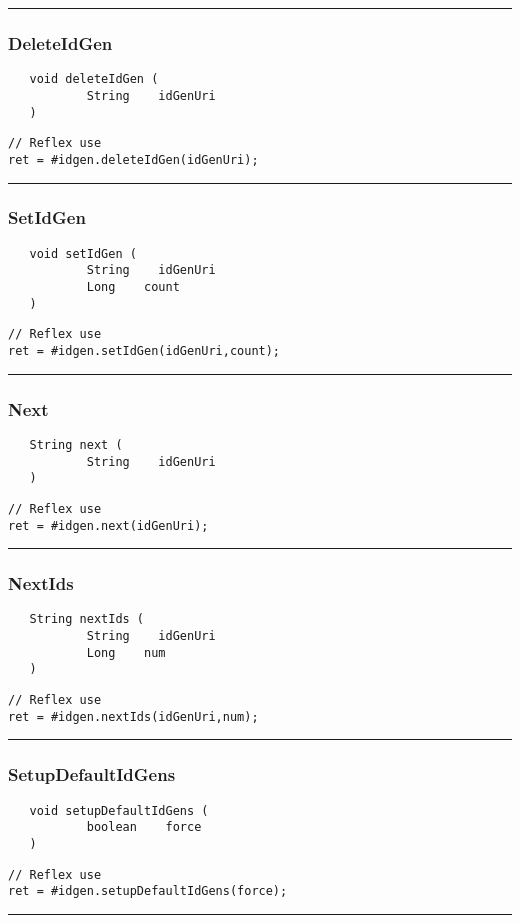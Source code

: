 \rule{15cm}{2pt}
\subsubsection{DeleteIdGen}
\label{Api:DeleteIdGen}
\begin{verbatim}
   void deleteIdGen (
           String    idGenUri
   )
\end{verbatim}
\begin{lstlisting}[language=reflex]
// Reflex use
ret = #idgen.deleteIdGen(idGenUri);
\end{lstlisting}



\rule{15cm}{2pt}
\subsubsection{SetIdGen}
\label{Api:SetIdGen}
\begin{verbatim}
   void setIdGen (
           String    idGenUri
           Long    count
   )
\end{verbatim}
\begin{lstlisting}[language=reflex]
// Reflex use
ret = #idgen.setIdGen(idGenUri,count);
\end{lstlisting}



\rule{15cm}{2pt}
\subsubsection{Next}
\label{Api:Next}
\begin{verbatim}
   String next (
           String    idGenUri
   )
\end{verbatim}
\begin{lstlisting}[language=reflex]
// Reflex use
ret = #idgen.next(idGenUri);
\end{lstlisting}



\rule{15cm}{2pt}
\subsubsection{NextIds}
\label{Api:NextIds}
\begin{verbatim}
   String nextIds (
           String    idGenUri
           Long    num
   )
\end{verbatim}
\begin{lstlisting}[language=reflex]
// Reflex use
ret = #idgen.nextIds(idGenUri,num);
\end{lstlisting}



\rule{15cm}{2pt}
\subsubsection{SetupDefaultIdGens}
\label{Api:SetupDefaultIdGens}
\begin{verbatim}
   void setupDefaultIdGens (
           boolean    force
   )
\end{verbatim}
\begin{lstlisting}[language=reflex]
// Reflex use
ret = #idgen.setupDefaultIdGens(force);
\end{lstlisting}



\rule{15cm}{2pt}
